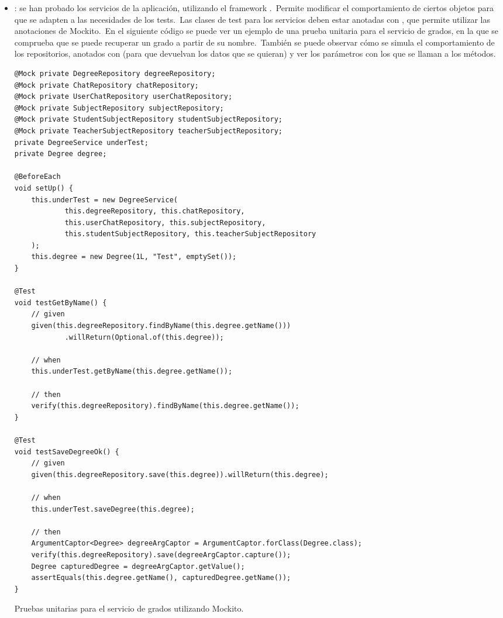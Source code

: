 \begin{itemize}
	\item {}: se han probado los servicios de la aplicación, utilizando el framework
	.\ Permite modificar el comportamiento de ciertos objetos para que se adapten a las necesidades
	de los tests.\ Las clases de test para los servicios deben estar anotadas con
	, que permite utilizar las anotaciones de Mockito.\ En el
	siguiente código se puede ver un ejemplo de una prueba unitaria para el servicio de grados, en la que se
	comprueba que se puede recuperar un grado a partir de su nombre.\ También se puede observar cómo se simula el
	comportamiento de los repositorios, anotados con  (para que devuelvan los datos que se quieran)
	y ver los parámetros con los que se llaman a los métodos.
	\begin{codeBlock}
		\begin{verbatim}
@Mock private DegreeRepository degreeRepository;
@Mock private ChatRepository chatRepository;
@Mock private UserChatRepository userChatRepository;
@Mock private SubjectRepository subjectRepository;
@Mock private StudentSubjectRepository studentSubjectRepository;
@Mock private TeacherSubjectRepository teacherSubjectRepository;
private DegreeService underTest;
private Degree degree;

@BeforeEach
void setUp() {
	this.underTest = new DegreeService(
			this.degreeRepository, this.chatRepository,
			this.userChatRepository, this.subjectRepository,
			this.studentSubjectRepository, this.teacherSubjectRepository
	);
	this.degree = new Degree(1L, "Test", emptySet());
}

@Test
void testGetByName() {
	// given
	given(this.degreeRepository.findByName(this.degree.getName()))
			.willReturn(Optional.of(this.degree));

	// when
	this.underTest.getByName(this.degree.getName());

	// then
	verify(this.degreeRepository).findByName(this.degree.getName());
}

@Test
void testSaveDegreeOk() {
	// given
	given(this.degreeRepository.save(this.degree)).willReturn(this.degree);

	// when
	this.underTest.saveDegree(this.degree);

	// then
	ArgumentCaptor<Degree> degreeArgCaptor = ArgumentCaptor.forClass(Degree.class);
	verify(this.degreeRepository).save(degreeArgCaptor.capture());
	Degree capturedDegree = degreeArgCaptor.getValue();
	assertEquals(this.degree.getName(), capturedDegree.getName());
}
		\end{verbatim}
		\caption{Pruebas unitarias para el servicio de grados utilizando Mockito.}
		\label{code:degreeServiceTest}
	\end{codeBlock}


\end{itemize}
